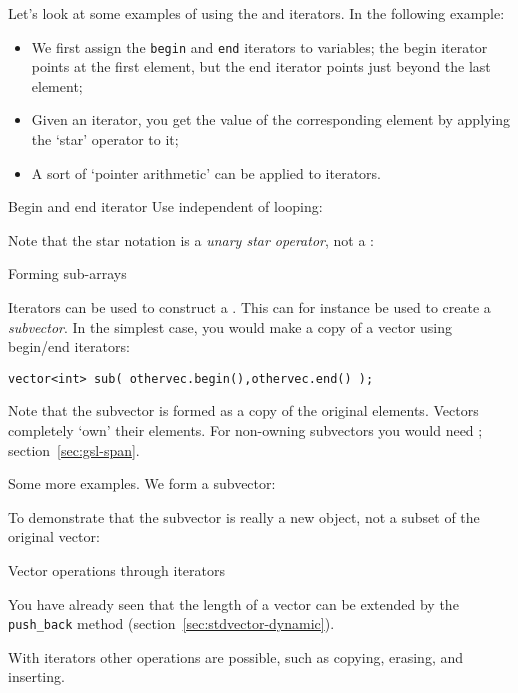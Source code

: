 Let's look at some examples of using
the  and  iterators.
In the following example:
\begin{itemize}
\item We first assign the \lstinline{begin} and \lstinline{end} iterators to variables;
  the begin iterator points at the first element,
  but the end iterator points just beyond the last element;
\item Given an iterator, you get the value of the corresponding element by
  applying the `star' operator to it;
\item A sort of `pointer arithmetic' can be applied to iterators.
\end{itemize}

\begin{block}{Begin and end iterator}
  \label{sl:vec-iterator}
  Use independent of looping:
\end{block}

Note that the star notation is a
\emph{unary star operator},
not a
:
%

 {Forming sub-arrays}

Iterators can be used to construct a . This can
for instance be used to create a
\emph{subvector}.
In the simplest case, you would make a copy
of a vector using begin/end iterators:
\begin{lstlisting}
vector<int> sub( othervec.begin(),othervec.end() );
\end{lstlisting}

Note that the subvector is formed as a copy of the original elements.
Vectors completely `own' their elements. For non-owning subvectors
you would need ; section~\ref{sec:gsl-span}.

Some more examples. We form a subvector:
%

To demonstrate that the subvector is really a new object,
not a subset of the original vector:

 {Vector operations through iterators}

You have already seen that the length of a vector can be
extended by the \lstinline+push_back+ method
(section~\ref{sec:stdvector-dynamic}).

With iterators other operations are possible,
such as copying, erasing, and inserting.

